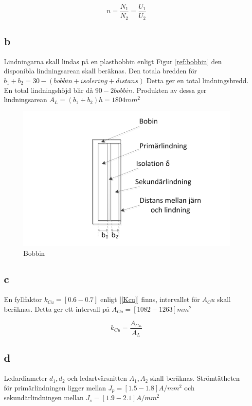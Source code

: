 \documentclass{article}
\begin{document}
\begin{equation}
  n=\frac{N_1}{N_2}=\frac{U_1}{U_2}
  \label{n}
\end{equation}

\subsection{b}
Lindningarna skall lindas på en plastbobbin enligt Figur \ref{ref:bobbin} den disponibla lindningsarean skall beräknas.
Den totala bredden för $b_1+b_2=30-(bobbin+isolering+distans)$ Detta ger en total lindningsbredd.
En total lindningshöjd blir då $90-2bobbin$.
Produkten av dessa ger lindningsarean $A_L=(b_1+b_2)h=1804 mm^2$

 \begin{figure}[H]
 \begin{center}
 \includegraphics[width=1\textwidth]{img/bobbin.png} %
 \caption{Bobbin}
 \label{fig:bobbin}
 \end{center}
 \end{figure}


\subsection{c}
En fyllfaktor $k_{Cu}=[0.6 - 0.7]$ enligt [\ref{Kcu}]  finns, intervallet för $A_Cu$ skall beräknas.
Detta ger ett intervall på $A_{Cu}=[1082 - 1263] mm^2$


\begin{equation}
  k_{Cu}=\frac{A_{Cu}}{A_L}
  \label{Kcu}
\end{equation}

\subsection{d}
Ledardiameter $d_1,d_2$ och ledartvärsnitten $A_1,A_2$ skall beräknas.
Strömtätheten för primärlindningen ligger mellan $J_p=[1.5 - 1.8] A/mm^2$ och sekundärlindningen mellan $J_s=[1.9 - 2.1] A/mm^2$
\end{document}
